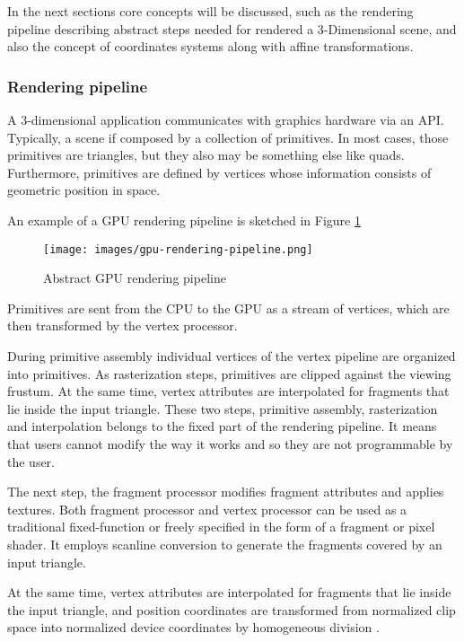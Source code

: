 \documentclass[12pt,a4paper]{extarticle}
\newcommand{\linespace}{\vspace{8pt}}
\begin{document}
In the next sections core concepts will be discussed, such as the rendering pipeline describing abstract steps needed for rendered a 3-Dimensional scene, and also the concept of coordinates systems along with affine transformations. 

\subsubsection{Rendering pipeline} 
A 3-dimensional application communicates with graphics hardware via an API. Typically, a scene if composed by a collection of primitives. In most cases, those primitives are triangles, but they also may be something else like quads.
Furthermore, primitives are defined by vertices whose information consists of geometric position in space.

An example of a GPU rendering pipeline is sketched in Figure \ref{fig:renderingpipeline} 

\begin{figure}[hbtp]

\centering
\texttt{[image: images/gpu-rendering-pipeline.png]}
\caption{Abstract GPU rendering pipeline}
\label{fig:renderingpipeline}
\end{figure}

Primitives are sent from the CPU to the GPU as a stream of vertices, which are then transformed by the vertex processor.

During primitive assembly individual vertices of the vertex pipeline are organized into primitives. As rasterization steps, primitives are clipped against the viewing frustum. At the same time, vertex attributes are interpolated for fragments that lie inside the input triangle. These two steps, primitive assembly, rasterization and interpolation belongs to the fixed part of the rendering pipeline. It means that users cannot modify the way it works and so they are not programmable by the user.

The next step, the fragment processor modifies fragment attributes and applies textures.
Both fragment processor and vertex processor can be used as a traditional fixed-function or freely specified in the form of a fragment or pixel shader. It employs scanline conversion to generate the fragments covered by an input triangle.


At the same time, vertex attributes are interpolated for fragments that lie inside the input triangle, and position coordinates are transformed from normalized clip space into normalized device coordinates by homogeneous division \cite{weiskopf_2006:1}.
\linespace
\end{document}
